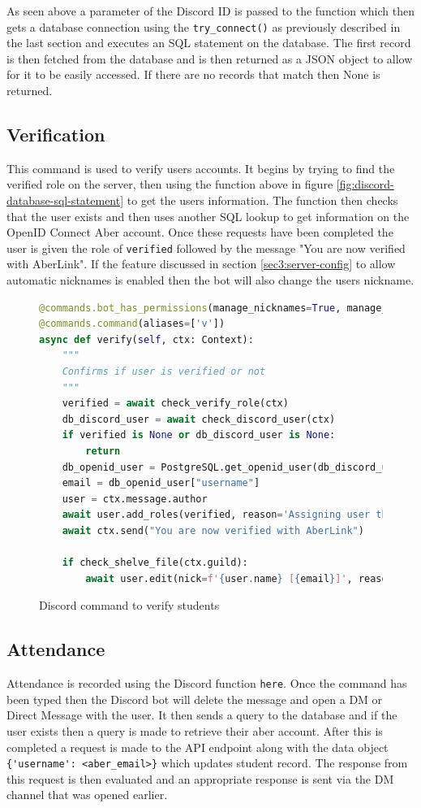 As seen above a parameter of the Discord ID is passed to the function which then gets a database connection using the \verb|try_connect()| as previously described in the last section and executes an SQL statement on the database. The first record is then fetched from the database and is then returned as a JSON object to allow for it to be easily accessed. If there are no records that match then None is returned.

\subsection{Verification}
This command is used to verify users accounts. It begins by trying to find the verified role on the server, then using the function above in figure \ref{fig:discord-database-sql-statement} to get the users information. The function then checks that the user exists and then uses another SQL lookup to get information on the OpenID Connect \cite{OpenID} Aber account. Once these requests have been completed the user is given the role of \verb|verified| followed by the message "You are now verified with AberLink". If the feature discussed in section \ref{sec3:server-config} to allow automatic nicknames is enabled then the bot will also change the users nickname.

\begin{figure}[H]
\begin{lstlisting}[language=Python]
@commands.bot_has_permissions(manage_nicknames=True, manage_roles=True)
@commands.command(aliases=['v'])
async def verify(self, ctx: Context):
	"""
	Confirms if user is verified or not
	"""
	verified = await check_verify_role(ctx)
	db_discord_user = await check_discord_user(ctx)
	if verified is None or db_discord_user is None:
		return
	db_openid_user = PostgreSQL.get_openid_user(db_discord_user["openidc_id"])
	email = db_openid_user["username"]
	user = ctx.message.author
	await user.add_roles(verified, reason='Assigning user the verified role')
	await ctx.send("You are now verified with AberLink")

	if check_shelve_file(ctx.guild):
        await user.edit(nick=f'{user.name} [{email}]', reason="Changing users\'s nickname")
\end{lstlisting}
\caption{Discord command to verify students}
\label{fig:discord-verify-cmd}
\end{figure}

\subsection{Attendance}
Attendance is recorded using the Discord function \verb|here|. Once the command has been typed then the Discord bot will delete the message and open a DM or Direct Message with the user. It then sends a query to the database and if the user exists then a query is made to retrieve their aber account. After this is completed a request is made to the API endpoint along with the data object \verb|{'username': <aber_email>}| which updates student record. The response from this request is then evaluated and an appropriate response is sent via the DM channel that was opened earlier.

